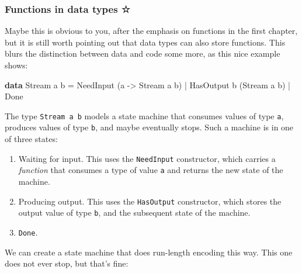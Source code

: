 \documentclass[11pt,
  american,
  DIV13]{article}
\newenvironment{Shaded}{}{}
\newcommand{\DataTypeTok}[1]{\textcolor[rgb]{0.56,0.13,0.00}{#1}}
\newcommand{\KeywordTok}[1]{\textcolor[rgb]{0.00,0.44,0.13}{\textbf{#1}}}
\newcommand{\NormalTok}[1]{#1}
\newcommand{\OperatorTok}[1]{\textcolor[rgb]{0.40,0.40,0.40}{#1}}
\newcommand{\OtherTok}[1]{\textcolor[rgb]{0.00,0.44,0.13}{#1}}
\providecommand{\tightlist}{%
  \setlength{\itemsep}{0pt}\setlength{\parskip}{0pt}}
\begin{document}
\hypertarget{functions-in-data-types}{%
\subsubsection{Functions in data types
☆}\label{functions-in-data-types}}

Maybe this is obvious to you, after the emphasis on functions in the
first chapter, but it is still worth pointing out that data types can
also store functions. This blurs the distinction between data and code
some more, as this nice example shows:

\begin{Shaded}
\begin{Highlighting}[]
\KeywordTok{data} \DataTypeTok{Stream}\NormalTok{ a b}
    \OtherTok{=} \DataTypeTok{NeedInput}\NormalTok{ (a }\OtherTok{{-}\textgreater{}} \DataTypeTok{Stream}\NormalTok{ a b)}
    \OperatorTok{|} \DataTypeTok{HasOutput}\NormalTok{ b (}\DataTypeTok{Stream}\NormalTok{ a b)}
    \OperatorTok{|} \DataTypeTok{Done}
\end{Highlighting}
\end{Shaded}

The type \texttt{Stream\ a\ b} models a state machine that consumes
values of type \texttt{a}, produces values of type \texttt{b}, and maybe
eventually stops. Such a machine is in one of three states:

\begin{enumerate}
\def\labelenumi{\arabic{enumi}.}
\tightlist
\item
  Waiting for input. This uses the \texttt{NeedInput} constructor, which
  carries a \emph{function} that consumes a type of value \texttt{a} and
  returns the new state of the machine.
\item
  Producing output. This uses the \texttt{HasOutput} constructor, which
  stores the output value of type \texttt{b}, and the subsequent state
  of the machine.
\item
  \texttt{Done}.
\end{enumerate}

We can create a state machine that does run-length encoding this way.
This one does not ever stop, but that's fine:
\end{document}
